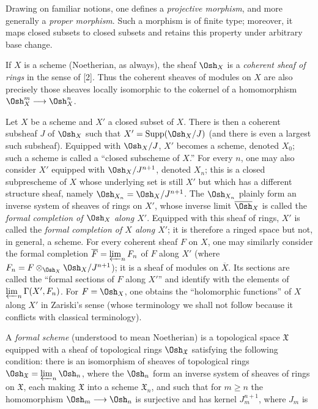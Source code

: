 Drawing on familiar notions, one defines a \emph{projective morphism}, and more
generally a \emph{proper morphism}. Such a morphism is of finite type; moreover,
it maps closed subsets to closed subsets and retains this property under
arbitrary base change.

If $X$ is a scheme (Noetherian, as always), the sheaf $\Osh_X$ is a
\emph{coherent sheaf of rings} in the sense of [2]. Thus the coherent sheaves
of modules on $X$ are also precisely those sheaves locally isomorphic to the
cokernel of a homomorphism $\Osh_X^{m}\longrightarrow\Osh_X^{n}$.


Let $X$ be a scheme and $X'$ a closed subset of $X$. There is then a coherent
subsheaf $J$ of $\Osh_X$ such that
$X'=\operatorname{Supp}(\Osh_X/J)$ (and there is even a largest such
subsheaf). Equipped with $\Osh_X/J$, $X'$ becomes a scheme, denoted $X_0$; such
a scheme is called a “closed subscheme of $X$.” For every $n$, one may also
consider $X'$ equipped with $\Osh_X/J^{n+1}$, denoted $X_n$; this is a closed
subprescheme of $X$ whose underlying set is still $X'$ but which has a
different structure sheaf, namely $\Osh_{X_n}=\Osh_X/J^{n+1}$. The
$\Osh_{X_n}$ plainly form an inverse system of sheaves of rings on $X'$, whose
inverse limit $\overline{\Osh}_X$ is called the \emph{formal completion of
$\Osh_X$ along $X'$}. Equipped with this sheaf of rings, $X'$ is called the
\emph{formal completion of $X$ along $X'$}; it is therefore a ringed space but
not, in general, a scheme. For every coherent sheaf $F$ on $X$, one may
similarly consider the formal completion
$\overline F=\varprojlim_n F_n$ of $F$ along $X'$ (where
$F_n=F\otimes_{\Osh_X}\Osh_X/J^{n+1}$); it is a sheaf of modules on
$\overline X$. Its sections are called the “formal sections of $F$ along
$X'$” and identify with the elements of
$\varprojlim_n\Gamma(X',F_n)$. For $F=\Osh_X$, one obtains the “holomorphic
functions” of $X$ along $X'$ in Zariski's sense (whose terminology we shall
not follow because it conflicts with classical terminology).

A \emph{formal scheme} (understood to mean Noetherian) is a topological space
$\mathfrak X$ equipped with a sheaf of topological rings
$\Osh_{\mathfrak X}$ satisfying the following condition: there is an
isomorphism of sheaves of topological rings
$\Osh_{\mathfrak X}=\varprojlim_n\Osh_n$, where the $\Osh_n$ form an inverse
system of sheaves of rings on $\mathfrak X$, each making $\mathfrak X$ into a
scheme $\mathfrak X_n$, and such that for $m\geq n$ the homomorphism
$\Osh_m\longrightarrow\Osh_n$ is surjective and has kernel $J_m^{n+1}$, where
$J_m$ is

